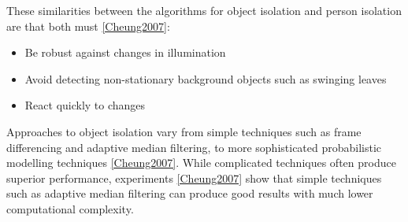 These similarities between the algorithms for object isolation and person isolation are that both must \ref{Cheung2007}:\begin{itemize}
  \item Be robust against changes in illumination
  \item Avoid detecting non-stationary background objects such as swinging leaves
  \item React quickly to changes
\end{itemize}

Approaches to object isolation vary from simple techniques such as frame differencing and adaptive median filtering, to more sophisticated probabilistic modelling techniques \ref{Cheung2007}. 
While complicated techniques often produce superior performance, experiments \ref{Cheung2007} show that simple techniques such as adaptive median filtering can produce good results with much lower computational complexity.\\

